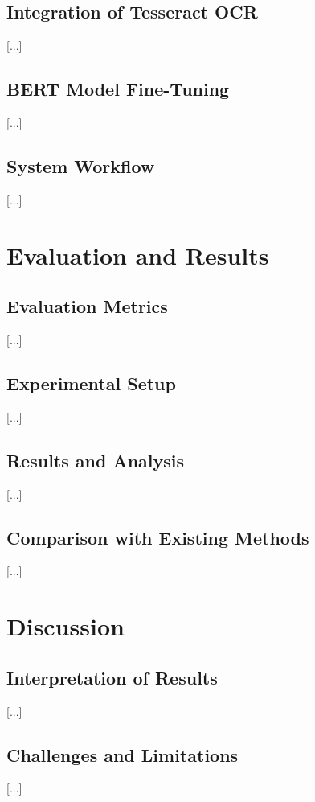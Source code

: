 \documentclass{SGGW-thesis-EN}
\begin{document}
\section{Integration of Tesseract OCR}
[...]

\section{BERT Model Fine-Tuning}
[...]

\section{System Workflow}
[...]

\chapter{Evaluation and Results}

\section{Evaluation Metrics}
[...]

\section{Experimental Setup}
[...]

\section{Results and Analysis}
[...]

\section{Comparison with Existing Methods}
[...]

\chapter{Discussion}

\section{Interpretation of Results}
[...]

\section{Challenges and Limitations}
[...]
\end{document}
